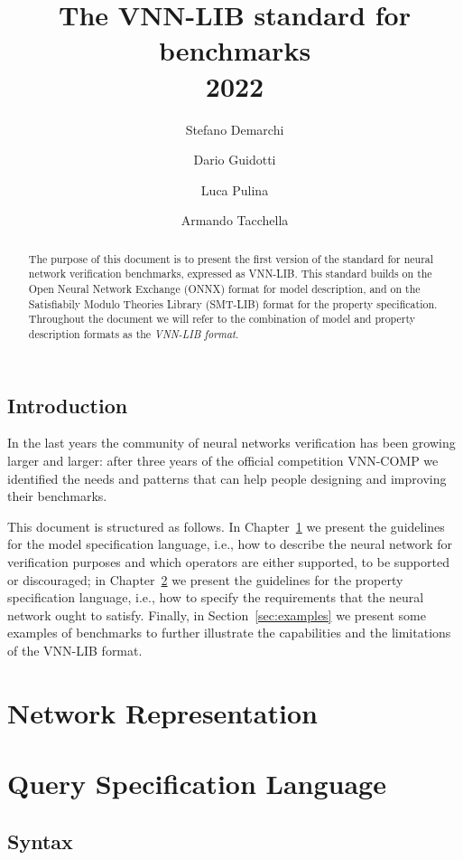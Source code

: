 \documentclass[12pt,a4paper]{report}
\title{The VNN-LIB standard for benchmarks\\2022}
\author[1]{Stefano Demarchi}
\author[2]{Dario Guidotti}
\author[2]{Luca Pulina}
\author[1]{Armando Tacchella}
\affil[1]{University of Genoa, Viale Causa 13, 16145 Genoa, Italy}
\affil[2]{University of Sassari, Via Roma 151, 07100 Sassari, Italy}
\begin{document}
\maketitle

\begin{abstract}
  The purpose of this document is to present the first version of the
  standard for neural network verification benchmarks, expressed as
  VNN-LIB. This standard builds on the Open Neural Network Exchange 
  (ONNX) format for model description, and on the Satisfiabily Modulo
  Theories Library (SMT-LIB) format for the property specification. 
  Throughout the document we will refer to the combination of model 
  and property description formats as the \emph{VNN-LIB format}.
\end{abstract}


\section*{Introduction}

In the last years the community of neural networks verification has
been growing larger and larger: after three years of the official
competition VNN-COMP we identified the needs and patterns that can
help people designing and improving their benchmarks.

This document is structured as follows. In Chapter~\ref{sec:model} we
present the guidelines for the model specification language, i.e., how
to describe the neural network for verification purposes and which 
operators are either supported, to be supported or discouraged; in
Chapter~\ref{sec:specification_language} we present the guidelines for the property
specification language, i.e., how to specify the requirements that the
neural network ought to satisfy. Finally, in Section~\ref{sec:examples} 
we present some examples of benchmarks to further illustrate the
capabilities and the limitations of the VNN-LIB format.

\chapter{Network Representation}
\label{sec:model}


\chapter{Query Specification Language}\label{sec:specification_language}

\section{Syntax}\label{sec:syntax}
\end{document}
